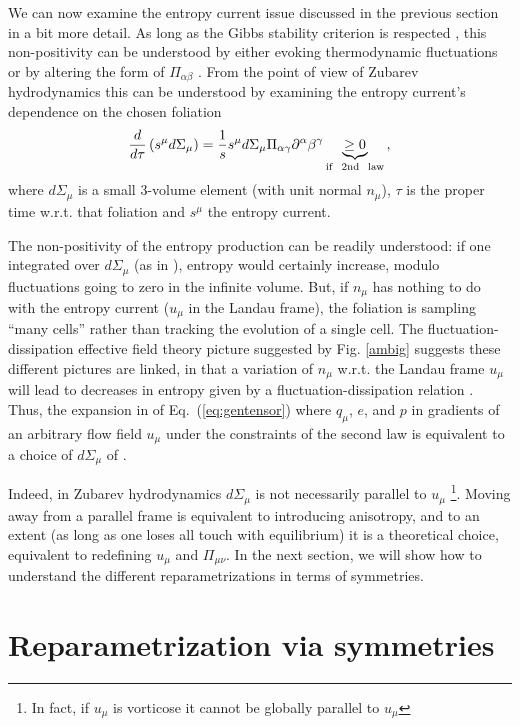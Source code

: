 \documentclass[12pt,onecolumn,showpacs,amssymb,aps,nofootinbib,floatfix]{revtex4-2}
\renewcommand{\eqref}[1]{Eq.~(\ref{#1})}
\begin{document}
\color{black}
	We can now examine the entropy current issue discussed in the previous section in a bit more detail. As long as the Gibbs stability criterion is respected \cite{gavagibbs}, this non-positivity can be understood by either evoking thermodynamic fluctuations \cite{crooks} or by altering the form of $\Pi_{\alpha \beta}$ \cite{gavassino}.
	From the point of view of Zubarev hydrodynamics \cite{zubbec} this can be understood by examining the entropy current's dependence on the chosen foliation
	\begin{equation}
		\label{noneqent}
		\frac{d}{d\tau} \left( s^\mu d \Sigma_\mu \right) = \frac{1 }{s}s^\mu d \Sigma_\mu\Pi_{\alpha \gamma} \partial^\alpha \beta^\gamma \underbrace{ \geq 0}_{\rm if\phantom{A}2nd\phantom{A}law}\,,
	\end{equation}
	where $d \Sigma_\mu$ is a small 3-volume element (with unit normal $n_\mu$), $\tau$ is the proper time w.r.t. that foliation and $s^\mu$ the entropy current. 
	
	The non-positivity of the entropy production can be readily understood: if one integrated over $d\Sigma_\mu$ (as in \cite{zubbec}), entropy would certainly increase, modulo fluctuations going to zero in the infinite volume.
	But, if $n_\mu$ has nothing to do with the entropy current ($u_\mu$ in the Landau frame), the foliation is sampling ``many cells'' rather than tracking the evolution of a single cell.  The fluctuation-dissipation effective field theory picture suggested by Fig. \ref{ambig} suggests these different pictures are linked, in that a variation of $n_\mu$ w.r.t. the Landau frame $u_\mu$ will lead to decreases in entropy given by a fluctuation-dissipation relation \cite{crooks}.
	Thus, the expansion in \cite{kovtun,kovtun2,bdnk} of \eqref{eq:gentensor} where $q_\mu$, $e$, and $p$ in gradients of an arbitrary flow field $u_\mu$ under the constraints of the second law is equivalent to a choice of $d\Sigma_\mu$ of \cite{zubbec}.    
	
	Indeed, in Zubarev hydrodynamics $d\Sigma_\mu$ is not necessarily parallel to $u_\mu$ \footnote{In fact, if $u_\mu$ is vorticose it cannot be globally parallel to $u_\mu$}. Moving away from a parallel frame is equivalent to introducing anisotropy, and to an extent (as long as one loses all touch with equilibrium) it is a theoretical choice, equivalent to redefining $u_\mu$ and $\Pi_{\mu \nu}$.
	In the next section, we will show how to understand the different reparametrizations in terms of symmetries.
	\section{Reparametrization via symmetries}\label{reparam}
\end{document}
